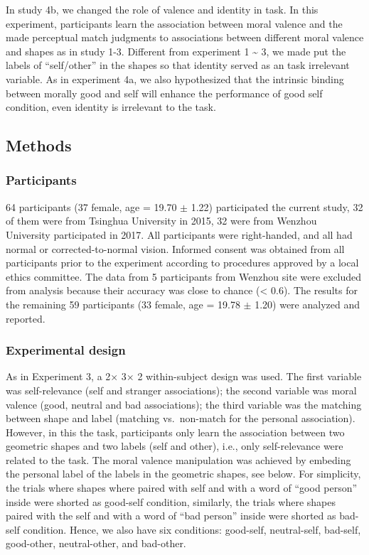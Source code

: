 \documentclass[
  english,
  man]{apa6}
\begin{document}
In study 4b, we changed the role of valence and identity in task. In this experiment, participants learn the association between moral valence and the made perceptual match judgments to associations between different moral valence and shapes as in study 1-3. Different from experiment 1 \textasciitilde{} 3, we made put the labels of \enquote{self/other} in the shapes so that identity served as an task irrelevant variable. As in experiment 4a, we also hypothesized that the intrinsic binding between morally good and self will enhance the performance of good self condition, even identity is irrelevant to the task.

\hypertarget{methods-1}{%
\subsection{Methods}\label{methods-1}}

\hypertarget{participants-6}{%
\subsubsection{Participants}\label{participants-6}}

64 participants (37 female, age = 19.70 \(\pm\) 1.22) participated the current study, 32 of them were from Tsinghua University in 2015, 32 were from Wenzhou University participated in 2017. All participants were right-handed, and all had normal or corrected-to-normal vision. Informed consent was obtained from all participants prior to the experiment according to procedures approved by a local ethics committee. The data from 5 participants from Wenzhou site were excluded from analysis because their accuracy was close to chance (\textless{} 0.6). The results for the remaining 59 participants (33 female, age = 19.78 \(\pm\) 1.20) were analyzed and reported.

\hypertarget{experimental-design}{%
\subsubsection{Experimental design}\label{experimental-design}}

As in Experiment 3, a 2× 3× 2 within-subject design was used. The first variable was self-relevance (self and stranger associations); the second variable was moral valence (good, neutral and bad associations); the third variable was the matching between shape and label (matching vs.~non-match for the personal association).
However, in this the task, participants only learn the association between two geometric shapes and two labels (self and other), i.e., only self-relevance were related to the task. The moral valence manipulation was achieved by embeding the personal label of the labels in the geometric shapes, see below. For simplicity, the trials where shapes where paired with self and with a word of \enquote{good person} inside were shorted as good-self condition, similarly, the trials where shapes paired with the self and with a word of \enquote{bad person} inside were shorted as bad-self condition. Hence, we also have six conditions: good-self, neutral-self, bad-self, good-other, neutral-other, and bad-other.
\end{document}
